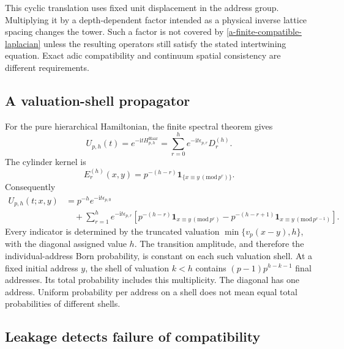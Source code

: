 This cyclic translation uses fixed unit displacement in the address
group. Multiplying it by a depth-dependent factor intended as a
physical inverse lattice spacing changes the tower. Such a factor is
not covered by \eqref{a-finite-compatible-laplacian} unless the
resulting operators still satisfy the stated intertwining equation.
Exact adic compatibility and continuum spatial consistency are
different requirements.

\subsection{A valuation-shell propagator}

For the pure hierarchical Hamiltonian, the finite spectral theorem gives
\begin{equation}
 U_{p,h}(t)=e^{-\mathrm{i}tH_{p,h}^{\mathrm{Haar}}}
 =\sum_{r=0}^he^{-\mathrm{i}t\epsilon_{p,r}}D_r^{(h)}.
 \label{a-finite-shell-propagator}
\end{equation}
The cylinder kernel is
\[
 E_r^{(h)}(x,y)=p^{-(h-r)}
              \mathbf1_{\{x\equiv y\, (\mathrm{mod}\,p^r)\}}.
\]
Consequently
\begin{align}
 U_{p,h}(t;x,y)
 &=p^{-h}e^{-\mathrm{i}t\epsilon_{p,0}}\nonumber\\
 &\quad+\sum_{r=1}^he^{-\mathrm{i}t\epsilon_{p,r}}
 \left[p^{-(h-r)}\mathbf1_{x\equiv y\,(\mathrm{mod}\,p^r)}
       -p^{-(h-r+1)}\mathbf1_{x\equiv y\,(\mathrm{mod}\,p^{r-1})}
 \right].
 \label{a-finite-shell-kernel}
\end{align}
Every indicator is determined by the truncated valuation
$\min\{v_p(x-y),h\}$, with the diagonal assigned value $h$.
The transition amplitude, and therefore the individual-address Born
probability, is constant on each such valuation shell. At a fixed
initial address $y$, the shell of valuation $k<h$ contains
$(p-1)p^{h-k-1}$ final addresses. Its total probability includes
this multiplicity. The diagonal has one address. Uniform probability
per address on a shell does not mean equal total probabilities of
different shells.



\subsection{Leakage detects failure of compatibility}
\label{a-finite-schur}

